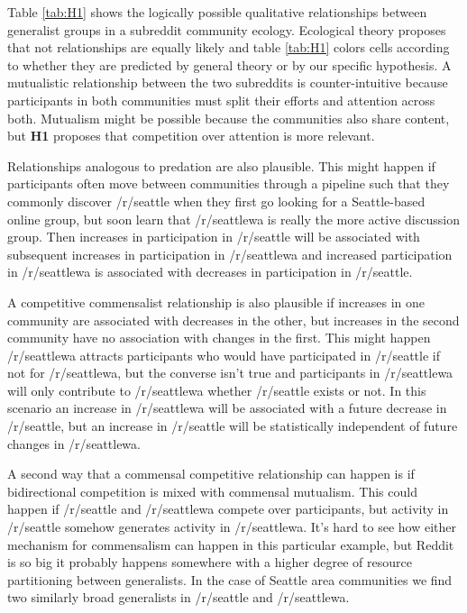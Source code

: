 \documentclass[12pt]{memoir}
\begin{document}
Table \ref{tab:H1} shows the logically possible qualitative relationships between generalist groups in a subreddit community ecology.  Ecological theory proposes that not relationships are equally likely and table \ref{tab:H1} colors cells according to whether they are predicted by general theory or by our specific hypothesis. 
A mutualistic relationship between the two subreddits is counter-intuitive because participants in both communities must split their efforts and attention across both. Mutualism might be possible because the communities also share content, but \textbf{H1} proposes that competition over attention is more relevant.  

Relationships analogous to predation are also plausible. This might happen if participants often move between communities through a pipeline such that they commonly discover /r/seattle when they first go looking for a Seattle-based online group, but soon learn that /r/seattlewa is really the more active discussion group.   Then increases in participation in /r/seattle will be associated with subsequent increases in participation in /r/seattlewa and increased participation in /r/seattlewa  is associated with decreases in participation in /r/seattle.

A competitive commensalist relationship is also plausible if increases in one community are associated with decreases in the other, but increases in the second community have no association with changes in the first.  This might happen  /r/seattlewa attracts participants who would have participated in /r/seattle if not for /r/seattlewa, but the converse isn't true and participants in /r/seattlewa will only contribute to /r/seattlewa whether /r/seattle exists or not.  In this scenario an increase in /r/seattlewa will be associated with a future decrease in /r/seattle, but an increase in /r/seattle will be statistically independent of future changes in /r/seattlewa.

A second way that a commensal competitive relationship can happen is if bidirectional competition is mixed with commensal mutualism. This could happen if /r/seattle and /r/seattlewa compete over participants, but activity in /r/seattle somehow generates activity in /r/seattlewa. It's hard to see how either mechanism for commensalism can happen in this particular example, but Reddit is so big it probably happens somewhere with a higher degree of resource partitioning between generalists.  In the case of Seattle area communities we find two similarly broad generalists in /r/seattle and /r/seattlewa.
\end{document}
